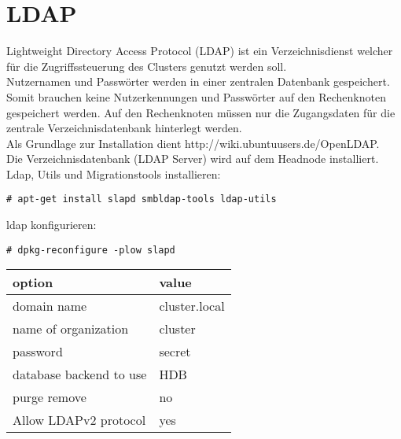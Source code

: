 \chapter{LDAP}
Lightweight Directory Access Protocol (LDAP) ist ein Verzeichnisdienst welcher für die Zugriffssteuerung des Clusters genutzt werden soll.\\
Nutzernamen und Passwörter werden in einer zentralen Datenbank gespeichert. Somit brauchen keine Nutzerkennungen und Passwörter auf den Rechenknoten gespeichert werden. 
Auf den Rechenknoten müssen nur die Zugangsdaten für die zentrale Verzeichnisdatenbank hinterlegt werden.\\
Als Grundlage zur Installation dient http://wiki.ubuntuusers.de/OpenLDAP.\\
Die Verzeichnisdatenbank (LDAP Server) wird auf dem Headnode installiert.
Ldap, Utils und Migrationstools installieren:
\begin{lstlisting}[style=Bash]
# apt-get install slapd smbldap-tools ldap-utils
\end{lstlisting}
ldap konfigurieren:
\begin{lstlisting}[style=Bash]
# dpkg-reconfigure -plow slapd
\end{lstlisting}
\begin{tabular}{ l | l }
 option & value\\
 \hline
 domain name & cluster.local\\
 name of organization & cluster\\
 password & secret\\
 database backend to use & HDB\\
 purge remove & no\\
 Allow LDAPv2 protocol & yes\\
\end{tabular}
